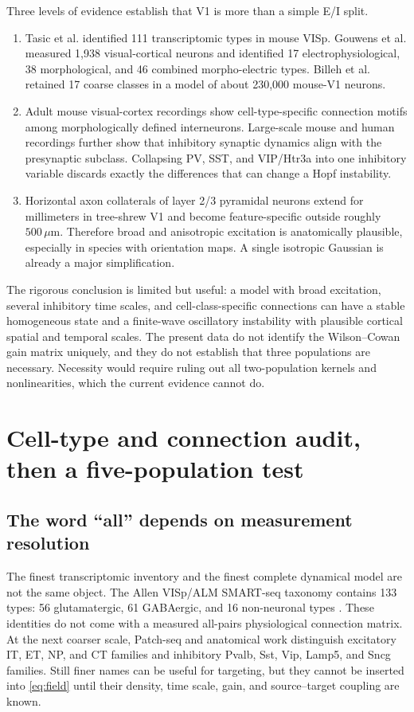 \documentclass[11pt]{article}
\begin{document}
Three levels of evidence establish that V1 is more than a simple E/I split.
\begin{enumerate}[label=\arabic*.]
 \item Tasic et al. identified 111 transcriptomic types in mouse VISp.  Gouwens
 et al. measured 1,938 visual-cortical neurons and identified 17
 electrophysiological, 38 morphological, and 46 combined morpho-electric
 types.  Billeh et al. retained 17 coarse classes in a model of about 230,000
 mouse-V1 neurons.
 \item Adult mouse visual-cortex recordings show cell-type-specific connection
 motifs among morphologically defined interneurons.  Large-scale mouse and
 human recordings further show that inhibitory synaptic dynamics align with
 the presynaptic subclass.  Collapsing PV, SST, and VIP/Htr3a into one
 inhibitory variable discards exactly the differences that can change a Hopf
 instability.
 \item Horizontal axon collaterals of layer 2/3 pyramidal neurons extend for
 millimeters in tree-shrew V1 and become feature-specific outside roughly
 $500\,\mu$m.  Therefore broad and anisotropic excitation is anatomically
 plausible, especially in species with orientation maps.  A single isotropic
 Gaussian is already a major simplification.
\end{enumerate}

The rigorous conclusion is limited but useful: a model with broad excitation,
several inhibitory time scales, and cell-class-specific connections can have
a stable homogeneous state and a finite-wave oscillatory instability with
plausible cortical spatial and temporal scales.  The present data do not
identify the Wilson--Cowan gain matrix uniquely, and they do not establish
that three populations are necessary.  Necessity would require ruling out all
two-population kernels and nonlinearities, which the current evidence cannot
do.

\section{Cell-type and connection audit, then a five-population test}
\label{sec:cell-audit}

\subsection{The word ``all'' depends on measurement resolution}

The finest transcriptomic inventory and the finest complete dynamical model
are not the same object.  The Allen VISp/ALM SMART-seq taxonomy contains 133
types: 56 glutamatergic, 61 GABAergic, and 16 non-neuronal types
\cite{tasic2018}.  These identities do not come with a measured all-pairs
physiological connection matrix.  At the next coarser scale, Patch-seq and
anatomical work distinguish excitatory IT, ET, NP, and CT families and
inhibitory Pvalb, Sst, Vip, Lamp5, and Sncg families.  Still finer names can be
useful for targeting, but they cannot be inserted into \eqref{eq:field} until
their density, time scale, gain, and source--target coupling are known.
\end{document}
